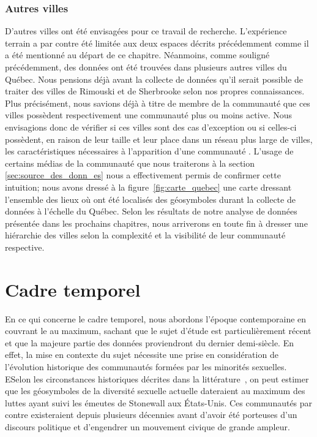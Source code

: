 \subsubsection{Autres villes}
\label{ssub:autres_villes}
D'autres villes ont été envisagées pour ce travail de recherche.
L'expérience terrain a par contre été limitée aux deux espaces décrits précédemment comme il a été mentionné au départ de ce chapitre.
Néanmoins, comme souligné précédemment, des données ont été trouvées dans plusieurs autres villes du Québec.
Nous pensions déjà avant la collecte de données qu'il serait possible de traiter des villes de Rimouski et de Sherbrooke selon nos propres connaissances.
Plus précisément, nous savions déjà à titre de membre de la communauté \lgbt{} que ces villes possèdent respectivement une communauté plus ou moins active.
Nous envisagions donc de vérifier si ces villes sont des cas d'exception ou si celles-ci possèdent, en raison de leur taille et leur place dans un réseau plus large de villes, les caractéristiques nécessaires à l'apparition d'une communauté \lgbt.
L'usage de certains médias de la communauté que nous traiterons à la section \ref{sec:source_des_donn_es} nous a effectivement permis de confirmer cette intuition; nous avons dressé à la figure~\ref{fig:carte_quebec} une carte dressant l'ensemble des lieux où ont été localisés des géosymboles durant la collecte de données à l'échelle du Québec.
Selon les résultats de notre analyse de données présentée dans les prochains chapitres, nous arriverons en toute fin à dresser une hiérarchie des villes selon la complexité et la visibilité de leur communauté respective.

\section{Cadre temporel}
\label{sec:cadre_temporel}
En ce qui concerne le cadre temporel, nous abordons l'époque contemporaine en couvrant le  au maximum, sachant que le sujet d'étude est particulièrement récent et que la majeure partie des données proviendront du dernier demi-siècle.
En effet, la mise en contexte du sujet nécessite une prise en considération de l'évolution historique des communautés formées par les minorités sexuelles.
ESelon les circonstances historiques décrites dans la littérature~\citep{Spencer2005}, on peut estimer que les géosymboles de la diversité sexuelle actuelle dateraient au maximum des luttes ayant suivi les émeutes de Stonewall aux États-Unis.
Ces communautés par contre existeraient depuis plusieurs décennies avant d'avoir été porteuses d'un discours politique et d'engendrer un mouvement civique de grande ampleur.

